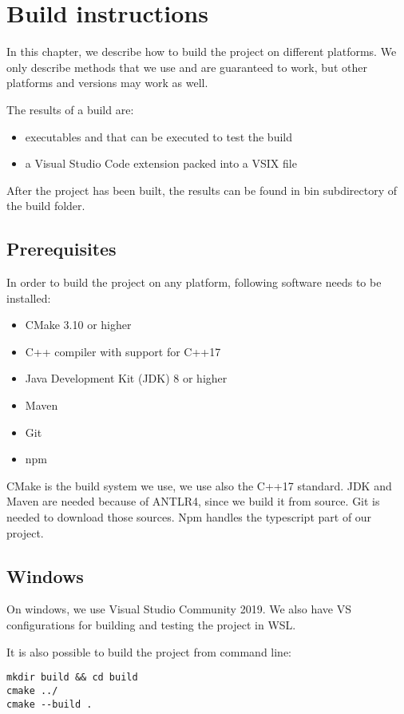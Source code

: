 \chapter{Build instructions}
\label{build}
In this chapter, we describe how to build the project on different platforms. We only describe methods that we use and are guaranteed to work, but other platforms and versions may work as well.

The results of a build are:
\begin{itemize}
	\item executables  and   that can be executed to test the build
	\item a Visual Studio Code extension packed into a VSIX file
\end{itemize}
After the project has been built, the results can be found in bin subdirectory of the build folder.

\section{Prerequisites}
\label{prereq}
In order to build the project on any platform, following software needs to be installed:

\begin{itemize}
	\item CMake 3.10 or higher
	\item C++ compiler with support for C++17
	\item Java Development Kit (JDK) 8 or higher 
	\item Maven
	\item Git 
	\item npm
\end{itemize}

CMake is the build system we use, we use also the C++17 standard. JDK and Maven are needed because of ANTLR4, since we build it from source. Git is needed to download those sources. Npm handles the typescript part of our project.

\section{Windows}

On windows, we use Visual Studio Community 2019. We also have VS configurations for building and testing the project in WSL.

It is also possible to build the project from command line:
\begin{verbatim}
mkdir build && cd build
cmake ../
cmake --build .
\end{verbatim}

